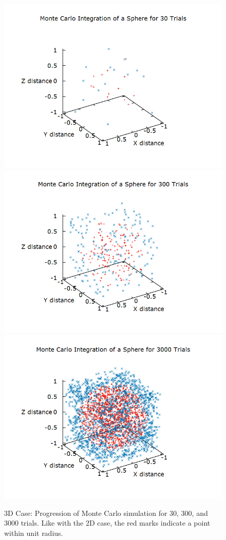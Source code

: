 \documentclass[aps,prl,twocolumn,superscriptaddress]{revtex4-1}
\begin{document}
\begin{figure}[htbp]
  	\begin{center}
 		\includegraphics[scale=0.32]{30.png} 
 		\includegraphics[scale=0.32]{300.png}
 		\includegraphics[scale=0.32]{3000.png}
  		\caption{3D Case: Progression of Monte Carlo simulation for 30, 300, and 3000 trials. Like with the 2D case, the red marks indicate a point within unit radius.}
  		\label{gr:3d}
 	\end{center}
\end{figure}
\end{document}
